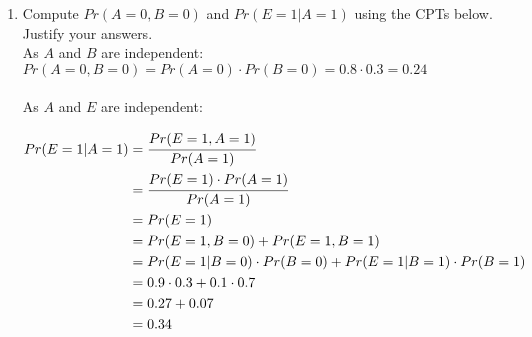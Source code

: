 \documentclass[12pt]{article}
\begin{document}
\begin{enumerate}
\begin{enumerate}
		\item Compute $Pr(A = 0, B = 0)$ and $Pr(E = 1 | A = 1)$ using the CPTs below. Justify your answers. \\

		As $A$ and $B$ are independent: \\

		$Pr(A = 0, B = 0) = Pr(A = 0) \cdot Pr(B = 0) = 0.8 \cdot 0.3 = 0.24$ \\\\

		As $A$ and $E$ are independent:

		\begin{align*}
		Pr(E = 1 | A = 1) &= \cfrac{Pr(E = 1, A = 1)}{Pr(A = 1)} \\
		&= \cfrac{Pr(E = 1) \cdot Pr(A = 1)}{Pr(A = 1)} \\ 
		&= Pr(E = 1) \\ 
		&= Pr(E = 1, B = 0) + Pr(E = 1, B = 1) \\ 
		&= Pr(E = 1 | B = 0) \cdot Pr(B = 0) + Pr(E = 1 | B = 1) \cdot Pr(B = 1) \\
		&= 0.9 \cdot 0.3 + 0.1 \cdot 0.7 \\
		&= 0.27 + 0.07 \\ 
		&= 0.34
		\end{align*}

	\end{enumerate}
\end{enumerate}
\end{document}
